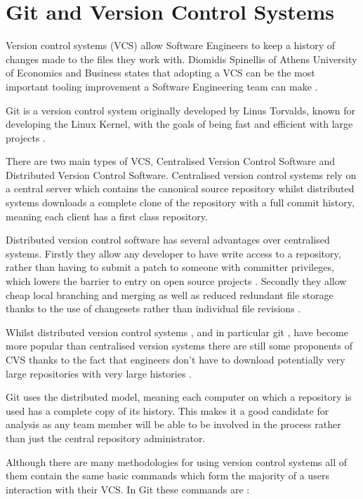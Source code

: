 \documentclass[11pt]{book}
\begin{document}
\section{Git and Version Control Systems}
\label{sec:git}
Version control systems (VCS) allow Software Engineers to keep a history of changes made to the files they work with. Diomidis Spinellis of Athens University of Economics and Business states that adopting a VCS can be the most important tooling improvement a Software Engineering team can make \cite{toolsofthetrade}.

Git is a version control system originally developed by Linus Torvalds, known for developing the Linux Kernel, with the goals of being fast and efficient with large projects \cite{progit}.

There are two main types of VCS, Centralised Version Control Software and Distributed Version Control Software. Centralised version control systems rely on a central server which contains the canonical source repository whilst distributed systems downloads a complete clone of the repository with a full commit history, meaning each client has a first class repository\cite{whydistributed}.

Distributed version control software has several advantages over centralised systems. Firstly they allow any developer to have write access to a repository, rather than having to submit a patch to someone with committer privileges, which lowers the barrier to entry on open source projects \cite{distributedimpactoss}. Secondly they allow cheap local branching and merging as well as reduced redundant file storage thanks to the use of changesets rather than individual file revisions \cite{distributedimpactoss}. 

Whilst distributed version control systems \cite{whydistributed}, and in particular git \cite{gitpopularity}, have become more popular than centralised version systems there are still some proponents of CVS thanks to the fact that engineers don't have to download potentially very large repositories with very large histories \cite{cvsvsvcs}.

Git uses the distributed model, meaning each computer on which a repository is used has a complete copy of its history. This makes it a good candidate for analysis as any team member will be able to be involved in the process rather than just the central repository administrator.

Although there are many methodologies for using version control systems all of them contain the same basic commands which form the majority of a users interaction with their VCS. In Git these commands are \cite{gitrefbasic}: 
\end{document}
